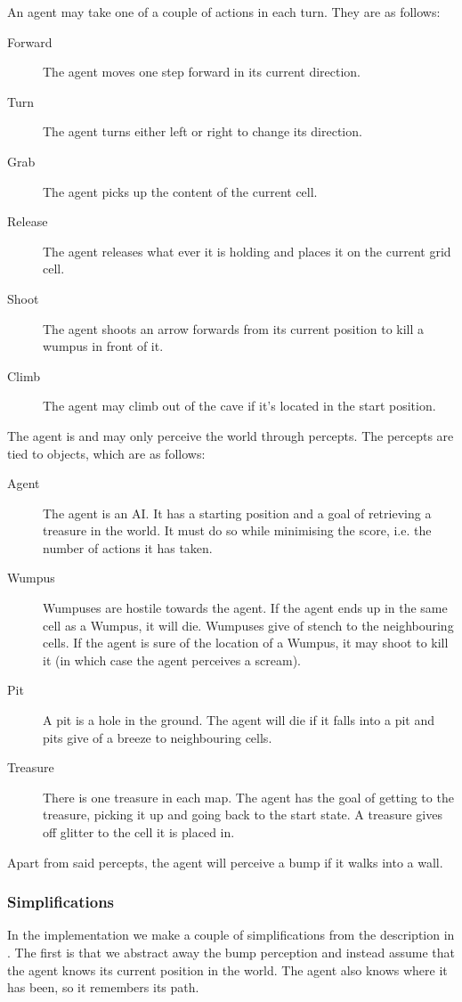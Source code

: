An agent may take one of a couple of actions in each turn. They are as follows:
\begin{description}
    \item[Forward] The agent moves one step forward in its current direction.
    \item[Turn] The agent turns either left or right to change its direction.
    \item[Grab] The agent picks up the content of the current cell.
    \item[Release] The agent releases what ever it is holding and places it on the current grid cell.
    \item[Shoot] The agent shoots an arrow forwards from its current position to kill a wumpus in front of it.
    \item[Climb] The agent may climb out of the cave if it's located in the start position.
\end{description}

The agent is  and may only perceive the world through percepts. The percepts are tied to objects, which are as follows:
\begin{description}
    \item[Agent] The agent is an \ac{AI}. It has a starting position and a goal of retrieving a treasure in the world. It must do so while minimising the score, i.e. the number of actions it has taken.
    \item[Wumpus] Wumpuses are hostile towards the agent. If the agent ends up in the same cell as a Wumpus, it will die. Wumpuses give of stench to the neighbouring cells. If the agent is sure of the location of a Wumpus, it may shoot to kill it (in which case the agent perceives a scream).
    \item[Pit] A pit is a hole in the ground. The agent will die if it falls into a pit and pits give of a breeze to neighbouring cells.
    \item[Treasure] There is one treasure in each map. The agent has the goal of getting to the treasure, picking it up and going back to the start state. A treasure gives off glitter to the cell it is placed in.
\end{description}
Apart from said percepts, the agent will perceive a bump if it walks into a wall.

\subsubsection{Simplifications}
In the implementation we make a couple of simplifications from the description in \cite{wumpus:world}. The first is that we abstract away the bump perception and instead assume that the agent knows its current position in the world.
The agent also knows where it has been, so it remembers its path.

